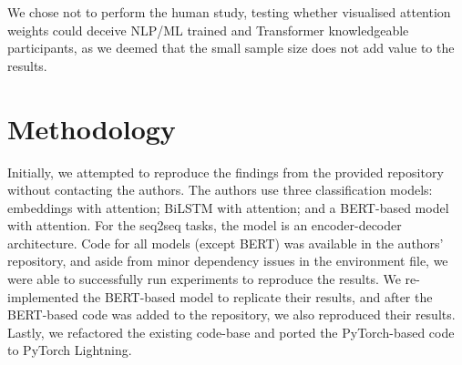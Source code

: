 We chose not to perform the human study, testing whether visualised attention weights could deceive NLP/ML trained and Transformer knowledgeable participants, as we deemed that the small sample size does not add value to the results.

\section{Methodology}
\label{sec:methodology}
Initially, we attempted to reproduce the findings from the provided repository without contacting the authors. The authors use three classification models: embeddings with attention; BiLSTM with attention; and a BERT-based model with attention. For the seq2seq tasks, the model is an encoder-decoder architecture. Code for all models (except BERT) was available in the authors' repository, and aside from minor dependency issues in the environment file, we were able to successfully run experiments to reproduce the results. We re-implemented the BERT-based model to replicate their results, and after the BERT-based code was added to the repository, we also reproduced their results. Lastly, we refactored the existing code-base and ported the PyTorch-based code to PyTorch Lightning.

